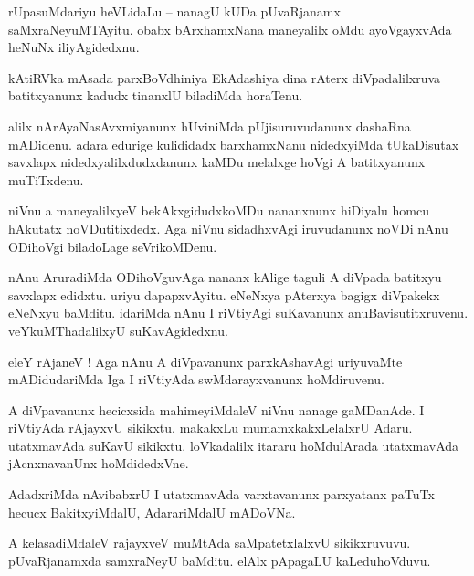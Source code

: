 \documentclass{article}
\begin{document}
\begin{mn}%
rUpasuMdariyu heVLidaLu -- nanagU kUDa pUvaRjanamx saMxraNeyuMTAyitu. obabx bArxhamxNana maneyalilx 
oMdu ayoVgayxvAda heNuNx iliyAgidedxnu.
\end{mn}

\begin{mn}%
kAtiRVka mAsada parxBoVdhiniya EkAdashiya dina rAterx diVpadalilxruva batitxyanunx kadudx tinanxlU 
biladiMda horaTenu.
\end{mn}

\begin{mn}%
alilx nArAyaNasAvxmiyanunx hUviniMda pUjisuruvudanunx dashaRna mADidenu. adara edurige kulididadx 
barxhamxNanu nidedxyiMda tUkaDisutax savxlapx nidedxyalilxdudxdanunx kaMDu melalxge hoVgi A 
batitxyanunx muTiTxdenu.
\end{mn}

\begin{mn}%
niVnu a maneyalilxyeV bekAkxgidudxkoMDu nananxnunx hiDiyalu homcu hAkutatx noVDutitixdedx. Aga 
niVnu sidadhxvAgi iruvudanunx noVDi nAnu ODihoVgi biladoLage seVrikoMDenu.
\end{mn}

\begin{mn}%
nAnu AruradiMda ODihoVguvAga nananx kAlige taguli A diVpada batitxyu savxlapx edidxtu. uriyu 
dapapxvAyitu. eNeNxya pAterxya bagigx diVpakekx eNeNxyu baMditu. idariMda nAnu I riVtiyAgi 
suKavanunx anuBavisutitxruvenu. veYkuMThadalilxyU suKavAgidedxnu.
\end{mn}

\begin{mn}%
eleY rAjaneV ! Aga nAnu A diVpavanunx parxkAshavAgi uriyuvaMte mADidudariMda Iga I riVtiyAda 
swMdarayxvanunx hoMdiruvenu.
\end{mn}

\begin{mn}%
A diVpavanunx hecicxsida mahimeyiMdaleV niVnu nanage gaMDanAde. I riVtiyAda rAjayxvU sikikxtu. 
makakxLu mumamxkakxLelalxrU Adaru. utatxmavAda suKavU sikikxtu. loVkadalilx itararu hoMdulArada 
utatxmavAda jAcnxnavanUnx hoMdidedxVne.
\end{mn}

\begin{mn}%
AdadxriMda nAvibabxrU I utatxmavAda varxtavanunx parxyatanx paTuTx hecucx BakitxyiMdalU, 
AdarariMdalU mADoVNa.
\end{mn}

\begin{mn}%
A kelasadiMdaleV rajayxveV muMtAda saMpatetxlalxvU sikikxruvuvu. pUvaRjanamxda samxraNeyU baMditu. 
elAlx pApagaLU kaLeduhoVduvu.
\end{mn}
\end{document}
